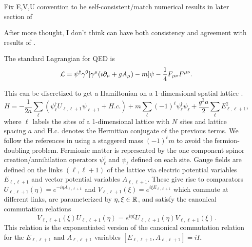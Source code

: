\documentclass[11pt,reqno]{amsart}
\begin{document}
	Fix E,V,U convention to be self-consistent/match numerical results in later section of \cite{Ercolessi18}
	
	After more thought, I don't think can have both consistency and agreement with results of \cite{Ercolessi18}.
	
	The standard Lagrangian for QED is 
	\begin{equation}
		\mathcal{L} = \psi^\dagger\gamma^0[\gamma^\mu(i\partial_\mu+gA_\mu)-m]\psi -\frac{1}{4}F_{\mu\nu}F^{\mu\nu}.
	\end{equation}
	
	This can be discretized to get a Hamiltonian on a 1-dimensional spatial lattice \cite{Ercolessi18,Notarnicola15,Wiese13}.
	\begin{equation}\label{eq:1dQEDLatticeHamiltonian}
		H=-\frac{1}{2a} \sum_\ell (\psi_\ell^\dagger U_{\ell,\ell+1}\psi_{\ell+1}+H.c.) + m\sum_\ell (-1)^\ell \psi_\ell^\dagger\psi_\ell+ \frac{g^2 a}{2} \sum_{\ell} E_{\ell,\ell+1}^2,		
	\end{equation}
	where $\ell$ labels the sites of a 1-dimensional lattice with $N$ sites and lattice spacing $a$ and H.c. denotes the Hermitian conjugate of the previous terms. 
	We follow the references in using a staggered mass $(-1)^\ell m$ to avoid the fermion-doubling problem.
	Fermionic matter is represented by the one component spinor creation/annihilation operators $\psi_\ell^\dagger$ and $\psi_\ell$ defined on each site.
	Gauge fields are defined on the links $(\ell,\ell+1)$ of the lattice via electric potential variables $E_{\ell,\ell+1}$ and vector potential variables $A_{\ell,\ell+1}$.
	These give rise to comparators $U_{\ell,\ell+1}(\eta)=e^{-i\eta A_{\ell,\ell+1}}$ and $V_{{\ell,\ell+1}}(\xi)=e^{i\xi E_{\ell,\ell+1}}$ which commute at different links, are parameterized by $\eta,\xi \in \mathbb{R}$, and satisfy the canonical commutation relations
	\begin{equation}\label{eq:1dQEDunitaryCCR}
		V_{\ell,\ell+1}(\xi)U_{\ell,\ell+1}(\eta)=e^{i\eta\xi}U_{\ell,\ell+1}(\eta)V_{\ell,\ell+1}(\xi).
	\end{equation}
	This relation is the exponentiated version of the canonical commutation relation for the $E_{\ell,\ell+1}$ and $A_{\ell,\ell+1}$ variables $[E_{\ell,\ell+1},A_{\ell,\ell+1}]=iI$.
	
\end{document}
